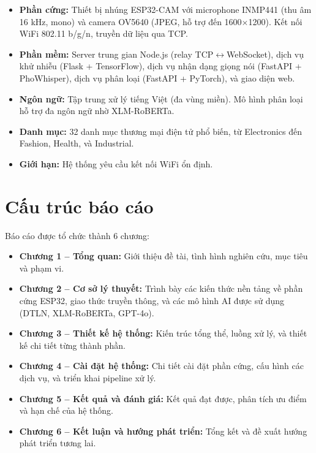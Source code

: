\begin{itemize}
\item \textbf{Phần cứng:} Thiết bị nhúng ESP32-CAM với microphone INMP441
  (thu âm 16 kHz, mono) và camera OV5640 (JPEG, hỗ trợ đến 1600$\times$1200).
  Kết nối WiFi 802.11 b/g/n, truyền dữ liệu qua TCP.
\item \textbf{Phần mềm:} Server trung gian Node.js (relay TCP$\leftrightarrow$WebSocket),
  dịch vụ khử nhiễu (Flask + TensorFlow), dịch vụ nhận dạng giọng nói
  (FastAPI + PhoWhisper), dịch vụ phân loại (FastAPI + PyTorch), và giao diện web.
\item \textbf{Ngôn ngữ:} Tập trung xử lý tiếng Việt (đa vùng miền).
  Mô hình phân loại hỗ trợ đa ngôn ngữ nhờ XLM-RoBERTa.
\item \textbf{Danh mục:} 32 danh mục thương mại điện tử phổ biến,
  từ Electronics đến Fashion, Health, và Industrial.
\item \textbf{Giới hạn:} Hệ thống yêu cầu kết nối WiFi ổn định.
\end{itemize}

\section{Cấu trúc báo cáo}

Báo cáo được tổ chức thành 6 chương:

\begin{itemize}
\item \textbf{Chương 1 -- Tổng quan:} Giới thiệu đề tài, tình hình nghiên cứu,
  mục tiêu và phạm vi.
\item \textbf{Chương 2 -- Cơ sở lý thuyết:} Trình bày các kiến thức nền tảng
  về phần cứng ESP32, giao thức truyền thông, và các mô hình AI được sử dụng
  (DTLN, XLM-RoBERTa, GPT-4o).
\item \textbf{Chương 3 -- Thiết kế hệ thống:} Kiến trúc tổng thể,
  luồng xử lý, và thiết kế chi tiết từng thành phần.
\item \textbf{Chương 4 -- Cài đặt hệ thống:} Chi tiết cài đặt phần cứng,
  cấu hình các dịch vụ, và triển khai pipeline xử lý.
\item \textbf{Chương 5 -- Kết quả và đánh giá:} Kết quả đạt được,
  phân tích ưu điểm và hạn chế của hệ thống.
\item \textbf{Chương 6 -- Kết luận và hướng phát triển:} Tổng kết
  và đề xuất hướng phát triển tương lai.
\end{itemize}
